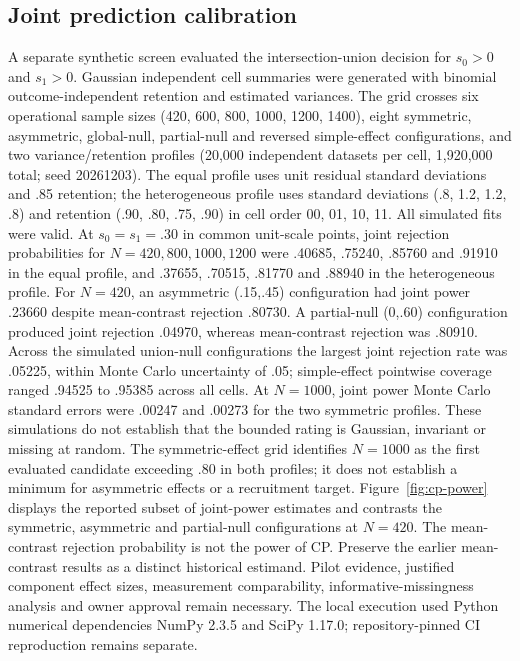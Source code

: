 \subsection{Joint prediction calibration}
A separate synthetic screen evaluated the intersection-union decision for $s_0>0$ and $s_1>0$. Gaussian independent cell summaries were generated with binomial outcome-independent retention and estimated variances. The grid crosses six operational sample sizes (420, 600, 800, 1000, 1200, 1400), eight symmetric, asymmetric, global-null, partial-null and reversed simple-effect configurations, and two variance/retention profiles (20,000 independent datasets per cell, 1,920,000 total; seed 20261203). The equal profile uses unit residual standard deviations and .85 retention; the heterogeneous profile uses standard deviations (.8, 1.2, 1.2, .8) and retention (.90, .80, .75, .90) in cell order 00, 01, 10, 11. All simulated fits were valid. At $s_0=s_1=.30$ in common unit-scale points, joint rejection probabilities for $N=420,800,1000,1200$ were .40685, .75240, .85760 and .91910 in the equal profile, and .37655, .70515, .81770 and .88940 in the heterogeneous profile. For $N=420$, an asymmetric (.15,.45) configuration had joint power .23660 despite mean-contrast rejection .80730. A partial-null (0,.60) configuration produced joint rejection .04970, whereas mean-contrast rejection was .80910. Across the simulated union-null configurations the largest joint rejection rate was .05225, within Monte Carlo uncertainty of .05; simple-effect pointwise coverage ranged .94525 to .95385 across all cells. At $N=1000$, joint power Monte Carlo standard errors were .00247 and .00273 for the two symmetric profiles. These simulations do not establish that the bounded rating is Gaussian, invariant or missing at random. The symmetric-effect grid identifies $N=1000$ as the first evaluated candidate exceeding .80 in both profiles; it does not establish a minimum for asymmetric effects or a recruitment target. Figure~\ref{fig:cp-power} displays the reported subset of joint-power estimates and contrasts the symmetric, asymmetric and partial-null configurations at $N=420$. The mean-contrast rejection probability is not the power of CP. Preserve the earlier mean-contrast results as a distinct historical estimand. Pilot evidence, justified component effect sizes, measurement comparability, informative-missingness analysis and owner approval remain necessary. The local execution used Python numerical dependencies NumPy 2.3.5 and SciPy 1.17.0; repository-pinned CI reproduction remains separate.

